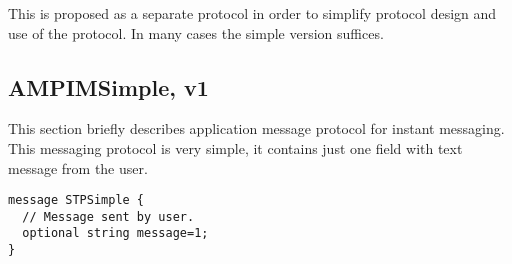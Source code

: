 \documentclass[a4paper,10pt]{article}
\begin{document}
This is proposed as a separate protocol in order to simplify protocol design and use of the protocol.
In many cases the simple version suffices.

\subsection{AMPIMSimple, v1}
This section briefly describes application message protocol for instant messaging. This messaging protocol is very simple,
it contains just one field with text message from the user.

\begin{Verbatim}[frame=single]
message STPSimple {
  // Message sent by user.
  optional string message=1;
}
\end{Verbatim} 
\end{document}
